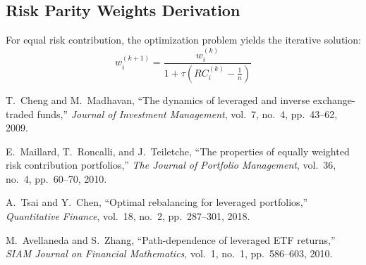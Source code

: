 \documentclass[11pt]{IEEEtran}
\begin{document}
\subsection{Risk Parity Weights Derivation}

For equal risk contribution, the optimization problem yields the iterative solution:
\begin{equation}
w_i^{(k+1)} = \frac{w_i^{(k)}}{1 + \tau \left( RC_i^{(k)} - \frac{1}{n} \right)}
\end{equation}

\begin{thebibliography}{9}

T.~Cheng and M.~Madhavan,
``The dynamics of leveraged and inverse exchange-traded funds,''
\emph{Journal of Investment Management}, vol.~7, no.~4, pp.~43--62, 2009.

E.~Maillard, T.~Roncalli, and J.~Teiletche,
``The properties of equally weighted risk contribution portfolios,''
\emph{The Journal of Portfolio Management}, vol.~36, no.~4, pp.~60--70, 2010.

A.~Tsai and Y.~Chen,
``Optimal rebalancing for leveraged portfolios,''
\emph{Quantitative Finance}, vol.~18, no.~2, pp.~287--301, 2018.

M.~Avellaneda and S.~Zhang,
``Path-dependence of leveraged ETF returns,''
\emph{SIAM Journal on Financial Mathematics}, vol.~1, no.~1, pp.~586--603, 2010.

\end{thebibliography}
\end{document}
